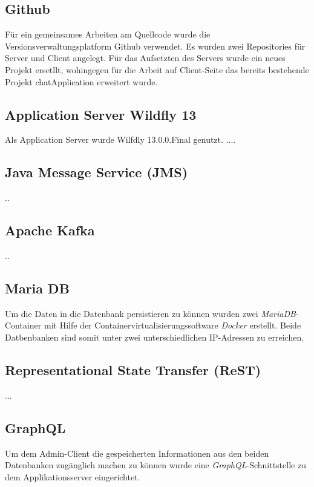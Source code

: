 \documentclass[10pt,journal,compsoc]{IEEEtran}
\begin{document}
\subsection{Github}
Für ein gemeinsames Arbeiten am Quellcode wurde die Versionsverwaltungsplatform Github verwendet. Es wurden zwei Repositories für Server und Client angelegt. Für das Aufsetzten des Servers wurde ein neues Projekt ersetllt, wohingegen für die Arbeit auf Client-Seite das bereits bestehende Projekt chatApplication erweitert wurde.

\subsection{Application Server Wildfly 13}

Als Application Server wurde Wilfdly 13.0.0.Final genutzt. ....


\subsection{Java Message Service (JMS)}
..
\subsection{Apache Kafka}
..



\subsection{Maria DB}
Um die Daten in die Datenbank persistieren zu können wurden zwei \textit{MariaDB}-Container mit Hilfe der Containervirtualisierungssoftware \textit{Docker} erstellt. Beide Datbenbanken sind somit unter zwei unterschiedlichen IP-Adressen zu erreichen.

\subsection{Representational State Transfer (ReST)}
...

\subsection{GraphQL}
Um dem Admin-Client die gespeicherten Informationen aus den beiden Datenbanken zugänglich machen zu können wurde eine \textit{GraphQL}-Schnittstelle zu dem Applikationsserver eingerichtet. 

\end{document}
